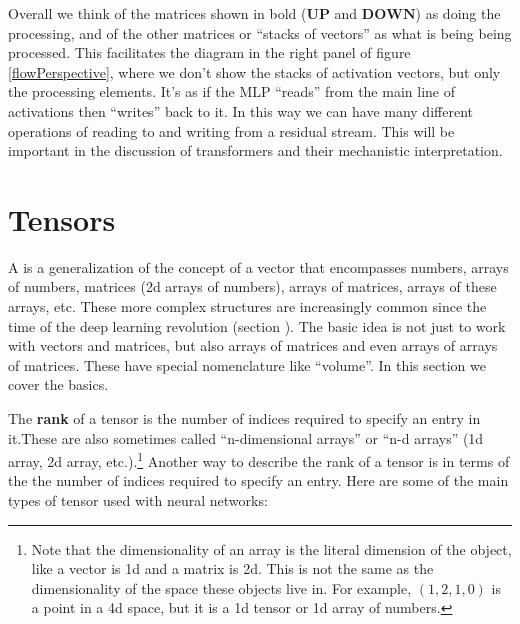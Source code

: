 Overall we think of the matrices shown in bold ($\mathbf{UP}$ and $\mathbf{DOWN}$) as doing the processing, and of the other matrices or ``stacks of vectors'' as what is being being processed. This facilitates the diagram in the right panel of figure  \ref{flowPerspective}, where we don't show the stacks of activation vectors, but only the processing elements. It's as if the MLP ``reads'' from the main line of activations then ``writes'' back to it. In this way we can have many different operations of reading to and writing from a residual stream. This will be important in the discussion of transformers and their mechanistic interpretation.

\section{Tensors}\label{sect_tensors}


A  is a generalization of the concept of a vector that encompasses numbers, arrays of numbers, matrices (2d arrays of numbers), arrays of matrices, arrays of these arrays, etc. These more complex structures are increasingly common since the time of the deep learning revolution (section ). The basic idea is not just to work with vectors and matrices, but also arrays of matrices and even arrays of arrays of matrices. These have special nomenclature like ``volume''. In this section we cover the basics.

The \textbf{rank} of a  tensor is the number of indices required to specify an entry in it.These are also sometimes called ``n-dimensional arrays'' or ``n-d arrays'' (1d array, 2d array, etc.).\footnote{Note that the dimensionality of an array is the literal dimension of the object, like a vector is 1d and a matrix is 2d. This is not the same as the dimensionality of the space these objects live in. For example, $(1,2,1,0)$ is a point in a 4d space, but it is a 1d tensor or 1d array of numbers.}  Another way to describe the rank of a  tensor is in terms of the the number of indices required to specify an entry.  Here are some of the main types of tensor used with neural networks:

